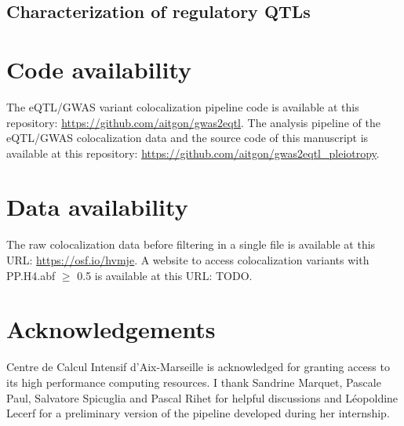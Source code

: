 \subsection*{Characterization of regulatory QTLs}

\section*{Code availability}

The eQTL/GWAS variant colocalization pipeline code is available at this repository: \url{https://github.com/aitgon/gwas2eqtl}.
%
The analysis pipeline of the eQTL/GWAS colocalization data and the source code of this manuscript is available at this repository: \url{https://github.com/aitgon/gwas2eqtl_pleiotropy}.

\section*{Data availability}

The raw colocalization data before filtering in a single file is available at this URL: \url{https://osf.io/hvmje}.
%
A website to access colocalization variants with PP.H4.abf $\geq$ 0.5 is available at this URL: TODO.

\section*{Acknowledgements}

Centre de Calcul Intensif d'Aix-Marseille is acknowledged for granting access to its high performance computing resources.
%
I thank Sandrine Marquet, Pascale Paul, Salvatore Spicuglia and Pascal Rihet for helpful discussions and L\'eopoldine Lecerf for a preliminary version of the pipeline developed during her internship.

